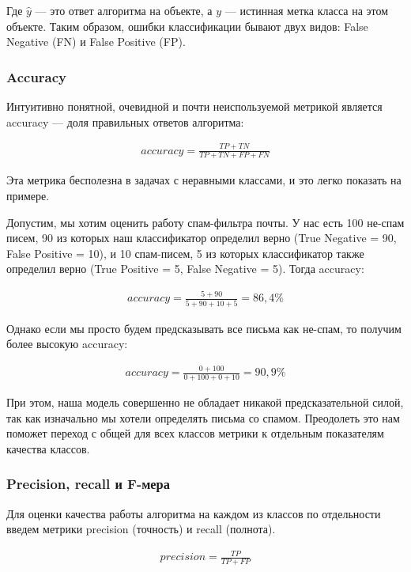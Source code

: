 \documentclass{article}
\begin{document}
	Где $\hat y$ — это ответ алгоритма на объекте, а $y$ — истинная метка класса на этом объекте.
	Таким образом, ошибки классификации бывают двух видов: False Negative (FN) и False Positive (FP).
	
	\subsubsection{Accuracy}
	
	Интуитивно понятной, очевидной и почти неиспользуемой метрикой является accuracy — доля правильных ответов алгоритма:
	
	\begin{align*}
	accuracy = \frac{TP + TN}{TP + TN + FP + FN}
	\end{align*}
	
	Эта метрика бесполезна в задачах с неравными классами, и это легко показать на примере.
	
	Допустим, мы хотим оценить работу спам-фильтра почты. У нас есть 100 не-спам писем, 90 из которых наш классификатор определил верно (True Negative = 90, False Positive = 10), и 10 спам-писем, 5 из которых классификатор также определил верно (True Positive = 5, False Negative = 5).
	Тогда accuracy:
	
	\begin{align*}
		accuracy = \frac{5 + 90}{5 + 90 + 10 + 5} = 86,4\% 
	\end{align*}
	
	Однако если мы просто будем предсказывать все письма как не-спам, то получим более высокую accuracy:
	
	\begin{align*}
		accuracy = \frac{0 + 100}{0 + 100 + 0 + 10} = 90,9\% 
	\end{align*}
	
	При этом, наша модель совершенно не обладает никакой предсказательной силой, так как изначально мы хотели определять письма со спамом. Преодолеть это нам поможет переход с общей для всех классов метрики к отдельным показателям качества классов.
	
	\subsubsection{Precision, recall и F-мера}
	
	Для оценки качества работы алгоритма на каждом из классов по отдельности введем метрики precision (точность) и recall (полнота).
	
	\begin{align*}
	precision = \frac{TP}{TP + FP}
	\end{align*}
\end{document}
